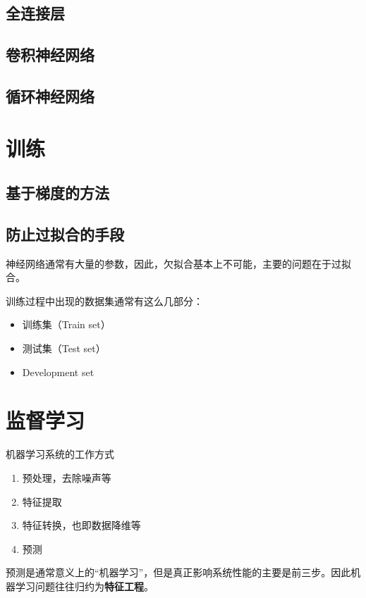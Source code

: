 \documentclass[UTF8, a4paper]{ctexart}
\begin{document}
\subsection{全连接层}

\subsection{卷积神经网络}

\subsection{循环神经网络}

\section{训练}

\subsection{基于梯度的方法}

\subsection{防止过拟合的手段}
神经网络通常有大量的参数，因此，欠拟合基本上不可能，主要的问题在于过拟合。

训练过程中出现的数据集通常有这么几部分：
\begin{itemize}
    \item 训练集（Train set）
    \item 测试集（Test set）
    \item Development set
\end{itemize}

\section{监督学习}

机器学习系统的工作方式
\begin{enumerate}
    \item 预处理，去除噪声等 
    \item 特征提取
    \item 特征转换，也即数据降维等
    \item 预测
\end{enumerate}
预测是通常意义上的“机器学习”，但是真正影响系统性能的主要是前三步。因此机器学习问题往往归约为\textbf{特征工程}。
\end{document}
